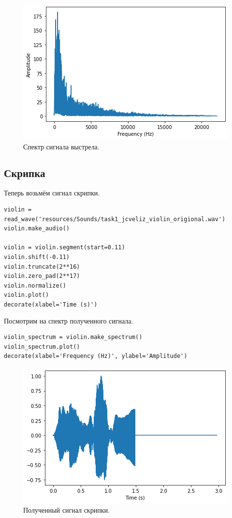\documentclass[a4paper, 14pt]{extarticle}
\begin{document}
    \begin{figure}[h]
        \centering
        \includegraphics[width=0.8\linewidth]{resources/Images/task1_shot_spectrum}
        \caption{Спектр сигнала выстрела.}
        \label{fig:task1_shot_spectrum}
    \end{figure}

    \subsection{Скрипка}
    \label{subsec:task1_2}
    Теперь возьмём сигнал скрипки.

    \begin{lstlisting}[caption= Чтение и преобразование сигнала скрипки., label={lst:task1_violin_wave}]
violin = read_wave('resources/Sounds/task1_jcveliz_violin_origional.wav')
violin.make_audio()

violin = violin.segment(start=0.11)
violin.shift(-0.11)
violin.truncate(2**16)
violin.zero_pad(2**17)
violin.normalize()
violin.plot()
decorate(xlabel='Time (s)')     \end{lstlisting}

    Посмотрим на спектр полученного сигнала.

    \begin{lstlisting}[caption= Получение спектра сигнала скрипки., label={lst:task1_violin_spectrum}]
violin_spectrum = violin.make_spectrum()
violin_spectrum.plot()
decorate(xlabel='Frequency (Hz)', ylabel='Amplitude')       \end{lstlisting}

    \begin{figure}[H]
        \centering
        \includegraphics[width=0.7\linewidth]{resources/Images/task1_violin_wave}
        \caption{Полученный сигнал скрипки.}
        \label{fig:task1_violin_wave}
    \end{figure}
\end{document}
